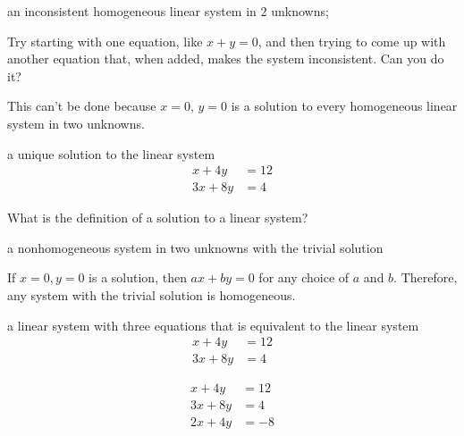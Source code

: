 \documentclass[hidelinks,12pt,handout]{ximera}
\begin{document}
\begin{exercise}
\begin{question}
an inconsistent homogeneous linear system in 2 unknowns;
\vfill
\begin{hint} Try starting with one equation, like $x+y = 0$, and then trying to come up with another equation that, when added, makes the system inconsistent. Can you do it? \end{hint}
\end{question}
	\begin{freeResponse}
			This can't be done because $x = 0$, $y = 0$ is a solution to every homogeneous linear system in two unknowns.
	\end{freeResponse}
\end{exercise}

\begin{question}a unique solution to the linear system 
	\begin{align*} x + 4 y &=  12 \\
				   3x + 8y &= 4
	\end{align*}
\begin{prompt}
\begin{multipleChoice}
\end{multipleChoice}
\end{prompt}

\begin{hint}
What is the definition of a solution to a linear system?
\end{hint}
\end{question}

\begin{question}
a nonhomogeneous system in two unknowns with the trivial solution
\vfill
	\begin{freeResponse}
			If $x = 0, y = 0$ is a solution, then $ax + by = 0$ for any choice of $a$ and $b$.  Therefore, any system with the trivial solution is homogeneous.
	\end{freeResponse}
\end{question}

\begin{question} a linear system with three equations that is equivalent to the linear system
	\begin{align*} x + 4 y &= 12 \\
				   3x + 8y &= 4
	\end{align*}
	\vfill
		\begin{freeResponse}
			\begin{align*}x + 4 y &= 12 \\ 3x + 8y &= 4 \\ 2x + 4y &= -8 \end{align*}
	\end{freeResponse}
\end{question}
\end{document}
